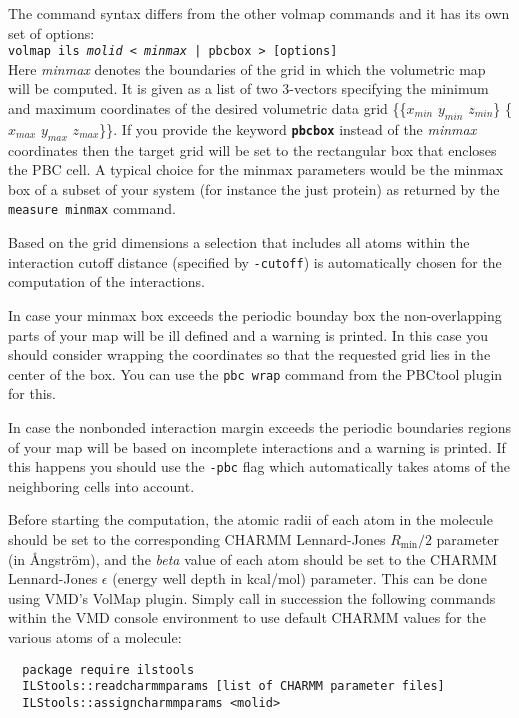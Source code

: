 The command syntax differs from the other volmap commands and
it has its own set of options:\\[2ex]
{\tt volmap ils {\it molid} < {\it minmax} | pbcbox > [options]}\\[2ex]

Here {\it minmax} denotes the boundaries of the grid in
which the volumetric map will be computed. It is given as
a list of two 3-vectors specifying the minimum and maximum
coordinates of the desired volumetric data grid 
\{\{$x_{min}$ $y_{min}$ $z_{min}$\}
\{$x_{max}$ $y_{max}$ $z_{max}$\}\}.
If you provide the keyword {\tt\bf pbcbox} instead of the {\it minmax}
coordinates then the target grid will be set to the rectangular
box that encloses the PBC cell. A typical choice for the minmax
parameters would be the minmax box of a subset of your system
(for instance the just protein) as returned by the {\tt measure
 minmax} command.

Based on the grid dimensions a selection that includes all atoms within
the interaction cutoff distance (specified by {\tt -cutoff}) is 
automatically chosen for the computation of the interactions.

In case your minmax box exceeds the periodic bounday box the
non-overlapping parts of your map will be ill defined and a warning
is printed. In this case you should consider wrapping the coordinates
so that the requested grid lies in the center of the box. You can use
the {\tt pbc wrap} command from the PBCtool plugin for this.

In case the nonbonded interaction margin exceeds the periodic 
boundaries regions of your map will be based on incomplete 
interactions and a warning is printed. If this happens you should 
use the {\tt -pbc} flag which automatically takes atoms of the 
neighboring cells into account.

Before starting the computation, the atomic radii of each atom in the
molecule should be set to the corresponding CHARMM Lennard-Jones
$R_\mathrm{min}/2$ parameter (in {\AA}ngstr\"om), and the {\it beta}
value of each atom should be set to the CHARMM Lennard-Jones $\epsilon$
(energy well depth in kcal/mol) parameter. 
This can be done using VMD's VolMap plugin. Simply call in succession 
the following commands within the VMD console environment to use default
CHARMM values for the various atoms of a molecule:
\begin{verbatim}
  package require ilstools
  ILStools::readcharmmparams [list of CHARMM parameter files]
  ILStools::assigncharmmparams <molid>
\end{verbatim}

